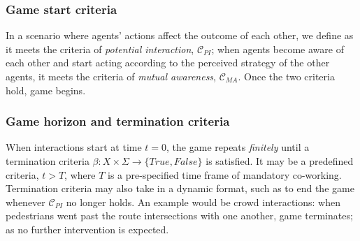 \documentclass[letterpaper, 10 pt, conference]{ieeeconf}  %
\begin{document}
\subsubsection{Game start criteria}
In a scenario where agents' actions affect the outcome of each other, we define as it meets the criteria of \textit{potential interaction}, $\mathcal{C}_{PI}$; when agents become aware of each other and start acting according to the perceived strategy of the other agents, it meets the criteria of \textit{mutual awareness}, $\mathcal{C}_{MA}$. Once the two criteria hold, game begins. 
\subsubsection{Game horizon and termination criteria}
When interactions start at time $t=0$, the game repeats \textit{finitely} 
until a termination criteria 
$\beta: X \times \Sigma \rightarrow \{True,False\}$ is satisfied. It may be a 
predefined criteria, $t>T$, where $T$ is a pre-specified time frame of 
mandatory co-working. Termination criteria may also take in a dynamic format, 
such as to end the game whenever $\mathcal{C}_{PI}$ no longer holds. An 
example would be crowd interactions: when pedestrians went past the route 
intersections with one another, game terminates; as no further intervention is 
expected.
\end{document}
